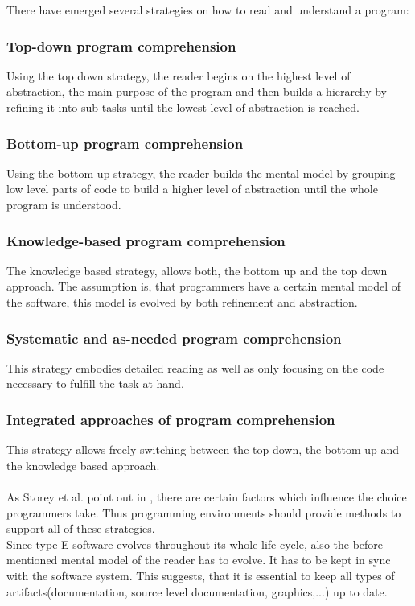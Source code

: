 There have emerged several strategies on how to read and understand a program\cite{Storey:1999:CDE:308936.308940}\cite{Storey:1997:PUT:832304.836998}:
\subsubsection*{Top-down program comprehension}
Using the top down strategy, the reader begins on the highest level of abstraction, the main purpose of the program and then builds a hierarchy by refining it into sub tasks until the lowest level of abstraction is reached.
\subsubsection*{Bottom-up program comprehension} Using the bottom up strategy, the reader builds the mental model by grouping low level parts of code to build a higher level of abstraction until the whole program is understood.
\subsubsection*{Knowledge-based program comprehension} The knowledge based strategy, allows both, the bottom up and the top down approach. The assumption is, that programmers have a certain mental model of the software, this model is evolved by both refinement and abstraction.
\subsubsection*{Systematic and as-needed program comprehension} This strategy embodies detailed reading as well as only focusing on the code necessary to fulfill the task at hand.
\subsubsection*{Integrated approaches of program comprehension} This strategy allows freely switching between the top down, the bottom up and the knowledge based approach.
\\\\
As Storey et al. point out in \cite{Storey:1999:CDE:308936.308940}, there are certain factors which influence the choice programmers take. Thus programming environments should provide methods to support all of these strategies.
\\
Since type E software evolves throughout its whole life cycle, also the before mentioned mental model of the reader has to evolve. It has to be kept in sync with the software system. This suggests, that it is essential to keep all types of artifacts(documentation, source level documentation, graphics,...) up to date.

